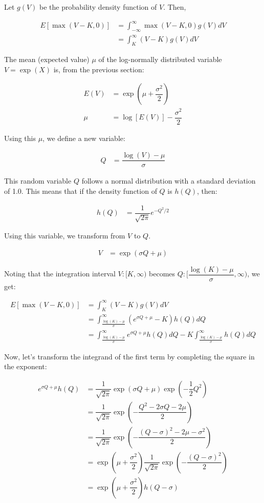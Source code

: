 \documentclass[uplatex]{jsarticle}
\begin{document}
Let $g(V)$ be the probability density function of $V$. Then,

\begin{align}
	E \left[ \max(V-K,0) \right] & = \int^{\infty}_{-\infty} \max(V-K,0) g(V) dV \\
	 & = \int^{\infty}_{K} (V-K) g(V) dV
\end{align}

The mean (expected value) $\mu$ of the log-normally distributed variable $V = \exp(X)$ is, from the previous section:

\begin{align}
	E(V) & = \exp( \mu + \dfrac{\sigma^{2}}{2} ) \\
	\mu& = \log[E(V)] - \dfrac{\sigma^{2}}{2}
\end{align}

Using this $\mu$, we define a new variable:

\begin{align}
	Q & = \dfrac{\log(V) - \mu}{\sigma}
\end{align}

This random variable $Q$ follows a normal distribution with a standard deviation of 1.0. This means that if the density function of $Q$ is $h(Q)$, then:

\begin{align}
	h(Q) & = \dfrac{ 1 }{ \sqrt{2 \pi} } e^{ - Q^{2} / 2 }
\end{align}

Using this variable, we transform from $V$ to $Q$.

\begin{align}
	V & = \exp(\sigma Q + \mu )
\end{align}

Noting that the integration interval $V: [K , \infty)$ becomes $Q: [ \dfrac{\log(K) - \mu}{\sigma} , \infty)$, we get:

\begin{align}
	E \left[ \max(V-K,0) \right] & = \int^{\infty}_{K} (V-K) g(V) dV \\
	 & = \int^{\infty}_{\frac{\log(K) - \mu}{\sigma}} ( e^{\sigma Q + \mu } -K) h(Q) dQ\\
	 & = \int^{\infty}_{\frac{\log(K) - \mu}{\sigma}} e^{\sigma Q + \mu } h(Q) dQ - K \int^{\infty}_{\frac{\log(K) - \mu}{\sigma}} h(Q) dQ
\end{align}

Now, let's transform the integrand of the first term by completing the square in the exponent:

\begin{align}
	e^{\sigma Q + \mu } h(Q) & = \dfrac{1}{\sqrt{2 \pi}} \exp(\sigma Q + \mu ) \exp(-\dfrac{1}{2} Q^{2}) \\
	 & = \dfrac{1}{\sqrt{2 \pi}} \exp( -\dfrac{ Q^{2} - 2 \sigma Q - 2 \mu }{2}) \\
	 & = \dfrac{1}{\sqrt{2 \pi}} \exp( -\dfrac{ (Q - \sigma)^{2} - 2 \mu - \sigma^{2} }{2})\\
	 & = \exp( \mu + \dfrac{\sigma^{2} }{2}) \dfrac{1}{\sqrt{2 \pi}} \exp( -\dfrac{ (Q - \sigma)^{2} }{2}) \\
	 & = \exp( \mu + \dfrac{\sigma^{2} }{2}) h(Q - \sigma)
\end{align}
\end{document}

